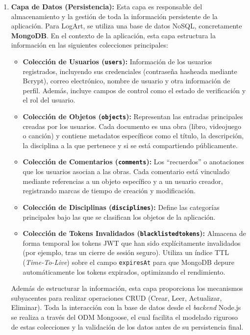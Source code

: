 \begin{enumerate}
    \item \textbf{Capa de Datos (Persistencia):}
    Esta capa es responsable del almacenamiento y la gestión de toda la información persistente de la aplicación. Para LogArt, se utiliza una base de datos NoSQL, concretamente \textbf{MongoDB}. En el contexto de la aplicación, esta capa estructura la información en las siguientes colecciones principales:
    \begin{itemize}
        \item \textbf{Colección de Usuarios (\texttt{users}):} Información de los usuarios registrados, incluyendo sus credenciales (contraseña hasheada mediante Bcrypt), correo electrónico, nombre de usuario y otra información de perfil. Además, incluye campos de control como el estado de verificación y el rol del usuario.
        \item \textbf{Colección de Objetos (\texttt{objects}):} Representan las entradas principales creadas por los usuarios. Cada documento es una obra (libro, videojuego o canción) y contiene metadatos específicos como el título, la descripción, la disciplina a la que pertenece y si se está compartiendo públicamente.
        \item \textbf{Colección de Comentarios (\texttt{comments}):} Los ``recuerdos'' o anotaciones que los usuarios asocian a las obras. Cada comentario está vinculado mediante referencias a un objeto específico y a un usuario creador, registrando marcas de tiempo de creación y modificación.
        \item \textbf{Colección de Disciplinas (\texttt{disciplines}):} Define las categorías principales bajo las que se clasifican los objetos de la aplicación.
        \item \textbf{Colección de Tokens Invalidados (\texttt{blacklistedtokens}):} Almacena de forma temporal los tokens JWT que han sido explícitamente invalidados (por ejemplo, tras un cierre de sesión seguro). Utiliza un índice TTL (\textit{Time-To-Live}) sobre el campo \texttt{expiresAt} para que MongoDB depure automáticamente los tokens expirados, optimizando el rendimiento.
    \end{itemize}
    
    Además de estructurar la información, esta capa proporciona los mecanismos subyacentes para realizar operaciones CRUD (Crear, Leer, Actualizar, Eliminar). Toda la interacción con la base de datos desde el \textit{backend} Node.js se realiza a través del ODM Mongoose, el cual facilita el modelado riguroso de estas colecciones y la validación de los datos antes de su persistencia final.
\end{enumerate}

